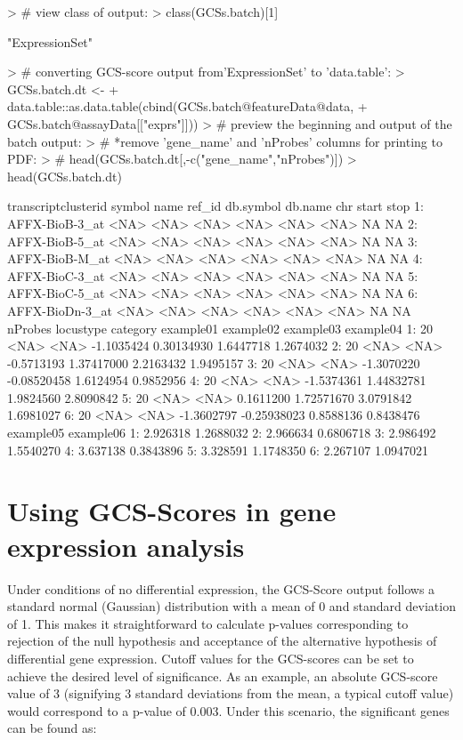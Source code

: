 \documentclass[12pt]{article}
\begin{document}
\begin{Schunk}
\begin{Sinput}
> # view class of output:
> class(GCSs.batch)[1]
\end{Sinput}
\begin{Soutput}
[1] "ExpressionSet"
\end{Soutput}
\begin{Sinput}
> # converting GCS-score output from'ExpressionSet' to 'data.table':
> GCSs.batch.dt <-
+   data.table::as.data.table(cbind(GCSs.batch@featureData@data,
+                                   GCSs.batch@assayData[["exprs"]]))
> # preview the beginning and output of the batch output:
> # *remove 'gene_name' and 'nProbes' columns for printing to PDF:
> # head(GCSs.batch.dt[,-c("gene_name","nProbes")])
> head(GCSs.batch.dt)
\end{Sinput}
\begin{Soutput}
   transcriptclusterid symbol name ref_id db.symbol db.name  chr start stop
1:      AFFX-BioB-3_at   <NA> <NA>   <NA>      <NA>    <NA> <NA>    NA   NA
2:      AFFX-BioB-5_at   <NA> <NA>   <NA>      <NA>    <NA> <NA>    NA   NA
3:      AFFX-BioB-M_at   <NA> <NA>   <NA>      <NA>    <NA> <NA>    NA   NA
4:      AFFX-BioC-3_at   <NA> <NA>   <NA>      <NA>    <NA> <NA>    NA   NA
5:      AFFX-BioC-5_at   <NA> <NA>   <NA>      <NA>    <NA> <NA>    NA   NA
6:     AFFX-BioDn-3_at   <NA> <NA>   <NA>      <NA>    <NA> <NA>    NA   NA
   nProbes locustype category  example01   example02 example03 example04
1:      20      <NA>     <NA> -1.1035424  0.30134930 1.6447718 1.2674032
2:      20      <NA>     <NA> -0.5713193  1.37417000 2.2163432 1.9495157
3:      20      <NA>     <NA> -1.3070220 -0.08520458 1.6124954 0.9852956
4:      20      <NA>     <NA> -1.5374361  1.44832781 1.9824560 2.8090842
5:      20      <NA>     <NA>  0.1611200  1.72571670 3.0791842 1.6981027
6:      20      <NA>     <NA> -1.3602797 -0.25938023 0.8588136 0.8438476
   example05 example06
1:  2.926318 1.2688032
2:  2.966634 0.6806718
3:  2.986492 1.5540270
4:  3.637138 0.3843896
5:  3.328591 1.1748350
6:  2.267107 1.0947021
\end{Soutput}
\end{Schunk}

\section{Using GCS-Scores in gene expression analysis}
Under conditions of no differential expression, the GCS-Score output follows a standard normal (Gaussian) distribution with a mean of 0 and standard deviation of 1. This makes it straightforward to calculate p-values corresponding to rejection of the null hypothesis and acceptance of the alternative hypothesis of differential gene expression. Cutoff values for the GCS-scores can be set to achieve the desired level of significance. As an example, an absolute GCS-score value of 3 (signifying 3 standard deviations from the mean, a typical cutoff value) would correspond to a p-value of 0.003. Under this scenario, the significant genes can be found as:
\end{document}
